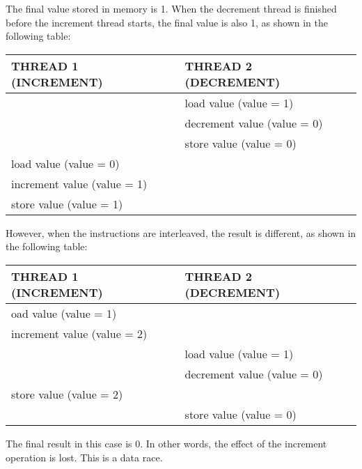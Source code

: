 The final value stored in memory is 1. When the decrement thread is finished before the increment thread starts, the final value is also 1, as shown in the following table:

\begin{longtable}{|l|l|}
\hline
\textbf{THREAD 1 (INCREMENT)} & \textbf{THREAD 2 (DECREMENT)} \\ \hline
\endfirsthead
%
\endhead
%
& load value (value = 1)        \\ \hline
& decrement value (value = 0)   \\ \hline
& store value (value = 0)       \\ \hline
load value (value = 0)        &                               \\ \hline
increment value (value = 1)   &                               \\ \hline
store value (value = 1)       &                               \\ \hline
\end{longtable}

However, when the instructions are interleaved, the result is different, as shown in the following table:

\begin{longtable}{|l|l|}
\hline
\textbf{THREAD 1 (INCREMENT)} & \textbf{THREAD 2 (DECREMENT)} \\ \hline
\endfirsthead
%
\endhead
%
oad value (value = 1)         &                               \\ \hline
increment value (value = 2)   &                               \\ \hline
& load value (value = 1)        \\ \hline
& decrement value (value = 0)   \\ \hline
store value (value = 2)       &                               \\ \hline
& store value (value = 0)       \\ \hline
\end{longtable}

The final result in this case is 0. In other words, the effect of the increment operation is lost. This is a data race.

